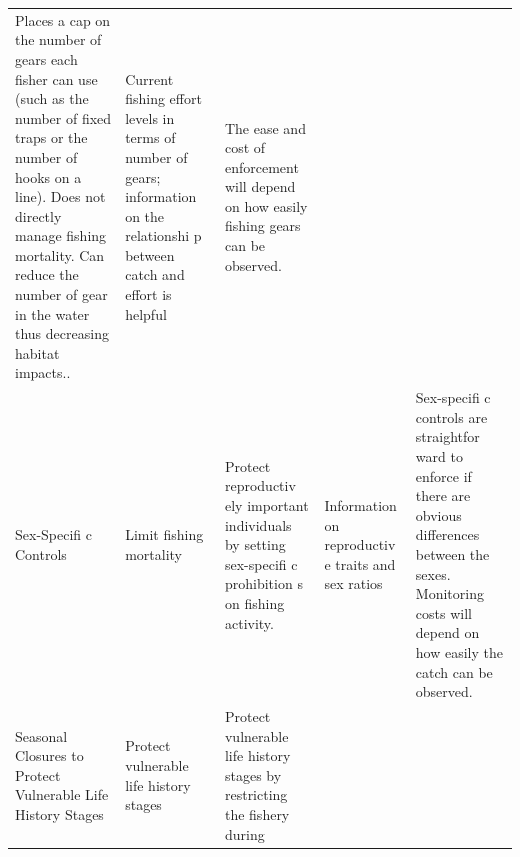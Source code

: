 \documentclass[]{book}
\begin{document}
\begin{longtable}[]{@{}lllll@{}}
\begin{minipage}[t]{0.17\columnwidth}
Places a cap on the number of gears each fisher can use (such as the
number of fixed traps or the number of hooks on a line). Does not
directly manage fishing mortality. Can reduce the number of gear in the
water thus decreasing habitat impacts..\strut
\end{minipage} & \begin{minipage}[t]{0.17\columnwidth}\raggedright\strut
Current fishing effort levels in terms of number of gears; information
on the relationshi p between catch and effort is helpful\strut
\end{minipage} & \begin{minipage}[t]{0.17\columnwidth}\raggedright\strut
The ease and cost of enforcement will depend on how easily fishing gears
can be observed.\strut
\end{minipage}\tabularnewline
\begin{minipage}[t]{0.17\columnwidth}\raggedright\strut
Sex-Specifi c Controls\strut
\end{minipage} & \begin{minipage}[t]{0.17\columnwidth}\raggedright\strut
Limit fishing mortality\strut
\end{minipage} & \begin{minipage}[t]{0.17\columnwidth}\raggedright\strut
Protect reproductiv ely important individuals by setting sex-specifi c
prohibition s on fishing activity.\strut
\end{minipage} & \begin{minipage}[t]{0.17\columnwidth}\raggedright\strut
Information on reproductiv e traits and sex ratios\strut
\end{minipage} & \begin{minipage}[t]{0.17\columnwidth}\raggedright\strut
Sex-specifi c controls are straightfor ward to enforce if there are
obvious differences between the sexes. Monitoring costs will depend on
how easily the catch can be observed.\strut
\end{minipage}\tabularnewline
\begin{minipage}[t]{0.17\columnwidth}\raggedright\strut
Seasonal Closures to Protect Vulnerable Life History Stages\strut
\end{minipage} & \begin{minipage}[t]{0.17\columnwidth}\raggedright\strut
Protect vulnerable life history stages\strut
\end{minipage} & \begin{minipage}[t]{0.17\columnwidth}\raggedright\strut
Protect vulnerable life history stages by restricting the fishery during

\end{minipage}
\end{longtable}
\end{document}
